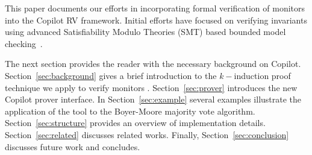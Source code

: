                                     
This paper documents our efforts in incorporating formal verification
of monitors into the Copilot RV framework.  Initial efforts have
focused on verifying invariants using advanced Satisfiability Modulo
Theories (SMT) based bounded model
checking~\cite{ClarkeBounded01}.  




The next section provides the reader with the necessary background on
Copilot. Section~\ref{sec:background} gives a brief introduction to
the $k-$induction proof technique we apply to verify
monitors .
Section~\ref{sec:prover} introduces the new Copilot prover
interface. In Section~\ref{sec:example} several examples illustrate
the application of the tool to the Boyer-Moore majority vote
algorithm. Section~\ref{sec:structure} provides an overview of
implementation details. Section~\ref{sec:related} discusses related
works. Finally, Section~\ref{sec:conclusion}
discusses future work and concludes.



  







